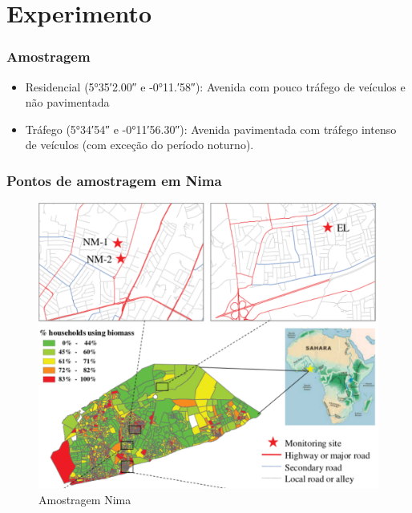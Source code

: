 \section{Experimento}

\begin{frame}
  \frametitle{Amostragem}
  \begin{itemize}
	  \item Residencial (\ang{+5;35;2.00} e \ang{-0;11.;58}):
	  Avenida com pouco tráfego de veículos e não pavimentada
  \item Tráfego (\ang{+5;34;54} e \ang{-0;11;56.30}):
	  Avenida pavimentada com tráfego intenso de veículos (com exceção do período noturno).
  \end{itemize}
\end{frame}

\begin{frame}
  \frametitle{Pontos de amostragem em Nima}
  \begin{figure}[H]
    \centering
    \caption{Amostragem Nima}
    \includegraphics[scale=0.35]{../../../inputs/zheng_images/nima_mapa.pdf}
  \end{figure}
\end{frame}

